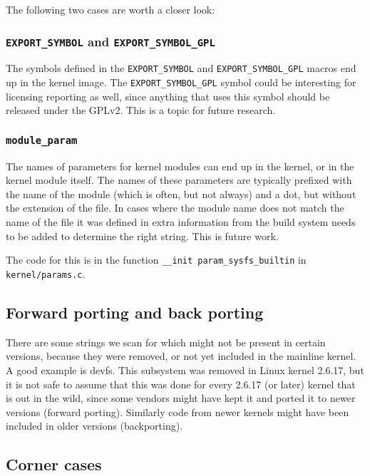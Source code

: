 \documentclass[10pt]{article}
\begin{document}
The following two cases are worth a closer look:

\subsubsection{\texttt{EXPORT\_SYMBOL} and \texttt{EXPORT\_SYMBOL\_GPL}}

The symbols defined in the \texttt{EXPORT\_SYMBOL} and
\texttt{EXPORT\_SYMBOL\_GPL} macros end up in the kernel image. The
\texttt{EXPORT\_SYMBOL\_GPL} symbol could be interesting for licensing
reporting as well, since anything that uses this symbol should be released
under the GPLv2. This is a topic for future research.

\subsubsection{\texttt{module\_param}}

The names of parameters for kernel modules can end up in the kernel, or in the
kernel module itself. The names of these parameters are typically prefixed
with the name of the module (which is often, but not always) and a dot, but
without the extension of the file. In cases where the module name does not
match the name of the file it was defined in extra information from the
build system needs to be added to determine the right string. This is future
work.

The code for this is in the function \texttt{\_\_init param\_sysfs\_builtin} in
\texttt{kernel/params.c}.

\subsection{Forward porting and back porting}

There are some strings we scan for which might not be present in certain
versions, because they were removed, or not yet included in the mainline
kernel. A good example is devfs. This subsystem was removed in Linux kernel
2.6.17, but it is not safe to assume that this was done for every 2.6.17 (or
later) kernel that is out in the wild, since some vendors might have kept it
and ported it to newer versions (forward porting). Similarly code from newer
kernels might have been included in older versions
(backporting).

\subsection{Corner cases}
\end{document}
